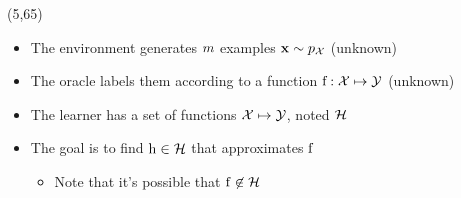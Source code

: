 \begin{frame}
  \begin{textblock}{90}(5,65)
    \begin{itemize}
    \item The environment generates $m$ examples
      $\mathbf{x} \sim p_{\mathcal{X}}$ (unknown)
    \item The oracle labels them according to a function $\mathrm{f}: \mathcal{X}
      \mapsto \mathcal{Y}$ (unknown)
    \item The learner has a set of functions $\mathcal{X}
      \mapsto \mathcal{Y}$, noted $\mathcal{H}$
    \item The goal is to find $\mathrm{h} \in \mathcal{H}$ that approximates
      $\mathrm{f}$
      \begin{itemize}
      \item Note that it's possible that $\mathrm{f} \not\in \mathcal{H}$
      \end{itemize}
    \end{itemize}
  \end{textblock}
\end{frame}


